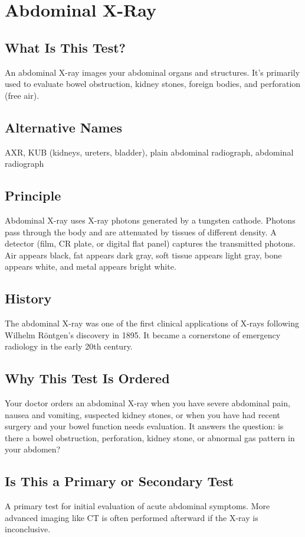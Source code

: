 \chapter{Abdominal X-Ray}

\section*{What Is This Test?}
An abdominal X-ray images your abdominal organs and structures. It's primarily used to evaluate bowel obstruction, kidney stones, foreign bodies, and perforation (free air).

\section*{Alternative Names}
AXR, KUB (kidneys, ureters, bladder), plain abdominal radiograph, abdominal radiograph


\section*{Principle}
Abdominal X-ray uses X-ray photons generated by a tungsten cathode. Photons pass through the body and are attenuated by tissues of different density. A detector (film, CR plate, or digital flat panel) captures the transmitted photons. Air appears black, fat appears dark gray, soft tissue appears light gray, bone appears white, and metal appears bright white.

\section*{History}
The abdominal X-ray was one of the first clinical applications of X-rays following Wilhelm Röntgen's discovery in 1895. It became a cornerstone of emergency radiology in the early 20th century.

\section*{Why This Test Is Ordered}
Your doctor orders an abdominal X-ray when you have severe abdominal pain, nausea and vomiting, suspected kidney stones, or when you have had recent surgery and your bowel function needs evaluation. It answers the question: is there a bowel obstruction, perforation, kidney stone, or abnormal gas pattern in your abdomen?

\section*{Is This a Primary or Secondary Test}
A primary test for initial evaluation of acute abdominal symptoms. More advanced imaging like CT is often performed afterward if the X-ray is inconclusive.

